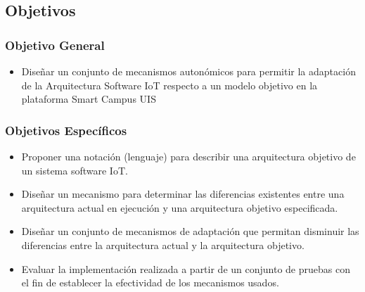 \subsection{Objetivos}
\subsubsection{Objetivo General}
\begin{itemize}

    \item Diseñar un conjunto de mecanismos autonómicos para permitir la adaptación de la Arquitectura Software IoT respecto a un modelo objetivo en la plataforma Smart Campus UIS

\end{itemize}

\subsubsection{Objetivos Específicos}

\begin{itemize}
    \item Proponer una notación (lenguaje) para describir una arquitectura objetivo de un sistema software IoT.
    \item Diseñar un mecanismo para determinar las diferencias existentes entre una arquitectura actual en ejecución y una arquitectura objetivo especificada.
    \item Diseñar un conjunto de mecanismos de adaptación que permitan disminuir las diferencias entre la arquitectura actual y la arquitectura objetivo.
    \item Evaluar la implementación realizada a partir de un conjunto de pruebas con el fin de establecer la efectividad de los mecanismos usados.
\end{itemize}